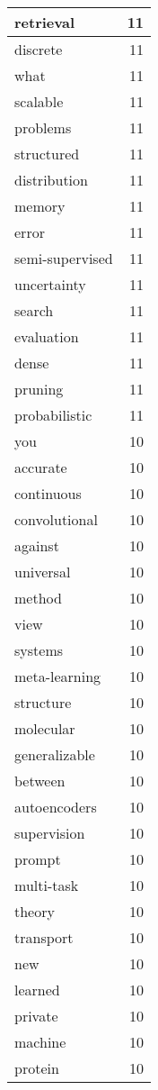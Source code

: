 \begin{table}[h]
\begin{tabular}{|l|r|}
\hline
retrieval & 11 \\
\hline
discrete & 11 \\
\hline
what & 11 \\
\hline
scalable & 11 \\
\hline
problems & 11 \\
\hline
structured & 11 \\
\hline
distribution & 11 \\
\hline
memory & 11 \\
\hline
error & 11 \\
\hline
semi-supervised & 11 \\
\hline
uncertainty & 11 \\
\hline
search & 11 \\
\hline
evaluation & 11 \\
\hline
dense & 11 \\
\hline
pruning & 11 \\
\hline
probabilistic & 11 \\
\hline
you & 10 \\
\hline
accurate & 10 \\
\hline
continuous & 10 \\
\hline
convolutional & 10 \\
\hline
against & 10 \\
\hline
universal & 10 \\
\hline
method & 10 \\
\hline
view & 10 \\
\hline
systems & 10 \\
\hline
meta-learning & 10 \\
\hline
structure & 10 \\
\hline
molecular & 10 \\
\hline
generalizable & 10 \\
\hline
between & 10 \\
\hline
autoencoders & 10 \\
\hline
supervision & 10 \\
\hline
prompt & 10 \\
\hline
multi-task & 10 \\
\hline
theory & 10 \\
\hline
transport & 10 \\
\hline
new & 10 \\
\hline
learned & 10 \\
\hline
private & 10 \\
\hline
machine & 10 \\
\hline
protein & 10 \\

\end{tabular}
\end{table}
